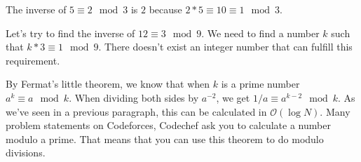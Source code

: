 The inverse of $5 \equiv 2 \mod{3}$ is $2$ because $2*5 \equiv 10 \equiv 1 \mod{3}$.

Let's try to find the inverse of $12 \equiv 3 \mod{9}$. 
We need to find a number $k$ such that $k*3 \equiv 1 \mod{9}$. There doesn't exist an integer number that can fulfill this requirement.

By Fermat's little theorem, we know that when $k$ is a prime number $a^k \equiv a \mod{k}$. When dividing both sides by $a^{-2}$, we get $1/a \equiv a^{k-2} \mod{k}$. As we've seen in a previous paragraph, this can be calculated in $ \mathcal{O}{\left(\log{N}\right)} $.
Many problem statements on Codeforces, Codechef ask you to calculate a number modulo a prime. That means that you can use this theorem to do modulo divisions.